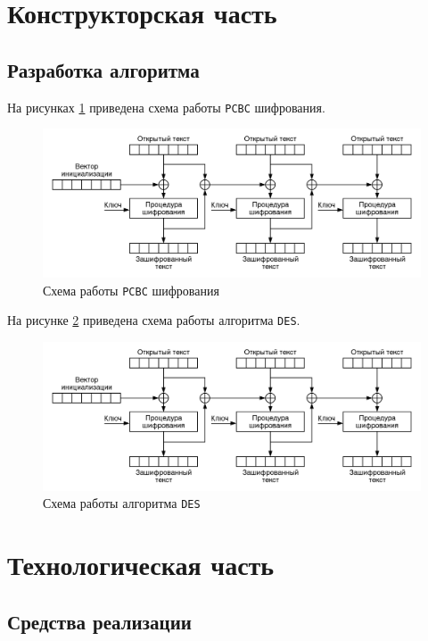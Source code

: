 \section{Конструкторская часть}

\subsection{Разработка алгоритма}

На рисунках \ref{fig:pcbc} приведена схема работы \texttt{PCBC} шифрования.

\begin{figure}[ht!]
	\centering
	\includegraphics[width=1\linewidth]{assets/images/PCBC_Encryption_ru.png}
	\caption{Схема работы \texttt{PCBC} шифрования}
	\label{fig:pcbc}
\end{figure}

На рисунке \ref{fig:des} приведена схема работы алгоритма \texttt{DES}.

\begin{figure}[ht!]
	\centering
	\includegraphics[width=1\linewidth]{assets/images/PCBC_Encryption_ru.png}
	\caption{Схема работы алгоритма \texttt{DES}}
	\label{fig:des}
\end{figure}

\section{Технологическая часть}

\subsection{Средства реализации}


